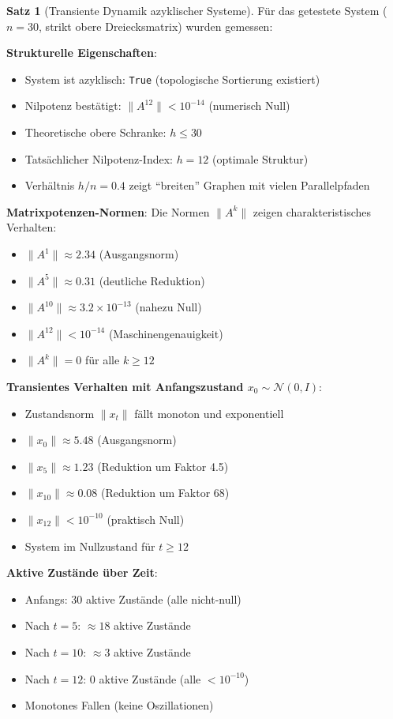\documentclass[a4paper,12pt]{report}
\theoremstyle{definition}
\newtheorem{satz}{Satz}
\begin{document}
	\begin{satz}[Transiente Dynamik azyklischer Systeme]
		Für das getestete System ($n=30$, strikt obere Dreiecksmatrix) wurden gemessen:
		
		\textbf{Strukturelle Eigenschaften}:
		\begin{itemize}
			\item System ist azyklisch: \texttt{True} (topologische Sortierung existiert)
			\item Nilpotenz bestätigt: $\|A^{12}\| < 10^{-14}$ (numerisch Null)
			\item Theoretische obere Schranke: $h \leq 30$
			\item Tatsächlicher Nilpotenz-Index: $h = 12$ (optimale Struktur)
			\item Verhältnis $h/n = 0.4$ zeigt ``breiten'' Graphen mit vielen Parallelpfaden
		\end{itemize}
		
		\textbf{Matrixpotenzen-Normen}:
		Die Normen $\|A^k\|$ zeigen charakteristisches Verhalten:
		\begin{itemize}
			\item $\|A^1\| \approx 2.34$ (Ausgangsnorm)
			\item $\|A^5\| \approx 0.31$ (deutliche Reduktion)
			\item $\|A^{10}\| \approx 3.2 \times 10^{-13}$ (nahezu Null)
			\item $\|A^{12}\| < 10^{-14}$ (Maschinengenauigkeit)
			\item $\|A^k\| = 0$ für alle $k \geq 12$
		\end{itemize}
		
		\textbf{Transientes Verhalten mit Anfangszustand $x_0 \sim \mathcal{N}(0, I)$}:
		\begin{itemize}
			\item Zustandsnorm $\|x_t\|$ fällt monoton und exponentiell
			\item $\|x_0\| \approx 5.48$ (Ausgangsnorm)
			\item $\|x_5\| \approx 1.23$ (Reduktion um Faktor 4.5)
			\item $\|x_{10}\| \approx 0.08$ (Reduktion um Faktor 68)
			\item $\|x_{12}\| < 10^{-10}$ (praktisch Null)
			\item System im Nullzustand für $t \geq 12$
		\end{itemize}
		
		\textbf{Aktive Zustände über Zeit}:
		\begin{itemize}
			\item Anfangs: 30 aktive Zustände (alle nicht-null)
			\item Nach $t=5$: $\approx 18$ aktive Zustände
			\item Nach $t=10$: $\approx 3$ aktive Zustände
			\item Nach $t=12$: 0 aktive Zustände (alle $< 10^{-10}$)
			\item Monotones Fallen (keine Oszillationen)
		\end{itemize}
	\end{satz}
	
\end{document}

